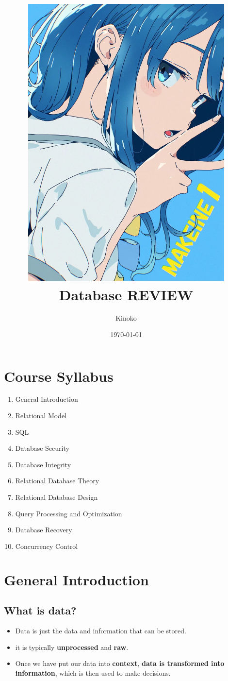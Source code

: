 \documentclass[a4paper, 12pt]{article}
\title{
    \includegraphics[width=0.8\textwidth]{Yanami_ep1.JPG}\\  %
    Database REVIEW
}
\author{Kinoko}
\date{\today}
\begin{document}

\begin{titlepage}  
    \maketitle
\end{titlepage}

\fancyhead[R]{}  %

\tableofcontents
\newpage  %


\section*{Course Syllabus}  %
    \begin{enumerate}
        \item General Introduction
        \item Relational Model
        \item SQL
        \item Database Security
        \item Database Integrity
        \item Relational Database Theory 
        \item Relational Database Design
        \item Query Processing and Optimization
        \item Database Recovery
        \item Concurrency Control
    \end{enumerate}

\newpage

\setcounter{section}{0}

\section{General Introduction}
    \subsection{What is data?}
        \begin{itemize}
            \item Data is just the data and information that can be stored.
            \item it is typically \textbf{unprocessed} and \textbf{raw}.
            \item Once we have put our data into \textbf{context}, \textbf{data is transformed into information}, which
            is then used to make decisions.
        \end{itemize}
    
\end{document}
